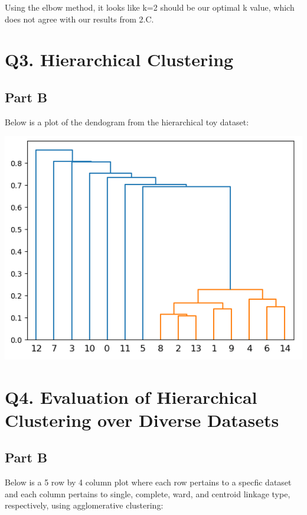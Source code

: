 \documentclass{article}
\begin{document}
Using the elbow method, it looks like k=2 should be our optimal k value, which does not agree with our 
results from 2.C.

\section*{Q3. Hierarchical Clustering}

\subsection*{Part B}
Below is a plot of the dendogram from the hierarchical toy dataset:

\includegraphics[width=\linewidth]{Images/Screenshot 2024-03-17 165911.png}

\section*{Q4. Evaluation of Hierarchical Clustering over Diverse Datasets}

\subsection*{Part B}
Below is a 5 row by 4 column plot where each row pertains to a specfic dataset and each column pertains to single, 
complete, ward, and centroid linkage type, respectively, using agglomerative clustering:
\end{document}
